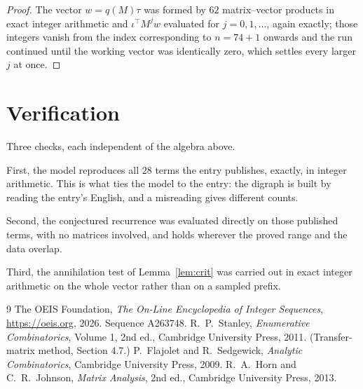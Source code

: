 \documentclass[11pt,a4paper]{article}
\theoremstyle{plain}
\theoremstyle{definition}
\begin{document}
\begin{proof}
The vector $w=q(M)\tau$ was formed by $62$ matrix--vector products in exact integer
arithmetic and $\iota^{\!\top}M^{j}w$ evaluated for $j=0,1,\dots$, again exactly; those
integers vanish from the index corresponding to $n=74+1$ onwards and the run continued
until the working vector was identically zero, which settles every larger $j$ at once.
\end{proof}

\section{Verification}

Three checks, each independent of the algebra above.

First, the model reproduces all $28$ terms the entry publishes, exactly, in integer
arithmetic. This is what ties the model to the entry: the digraph is built by reading the
entry's English, and a misreading gives different counts.

Second, the conjectured recurrence was evaluated directly on those published terms, with no
matrices involved, and holds wherever the proved range and the data overlap.

Third, the annihilation test of Lemma~\ref{lem:crit} was carried out in exact integer
arithmetic on the whole vector rather than on a sampled prefix.

\begin{thebibliography}{9}
 The OEIS Foundation, \emph{The On-Line Encyclopedia of Integer
Sequences}, \url{https://oeis.org}, 2026. Sequence A263748.
 R.~P.~Stanley, \emph{Enumerative Combinatorics}, Volume 1, 2nd ed.,
Cambridge University Press, 2011. (Transfer-matrix method, Section 4.7.)
 P.~Flajolet and R.~Sedgewick, \emph{Analytic Combinatorics}, Cambridge
University Press, 2009.
 R.~A.~Horn and C.~R.~Johnson, \emph{Matrix Analysis}, 2nd ed., Cambridge
University Press, 2013.
\end{thebibliography}
\end{document}
